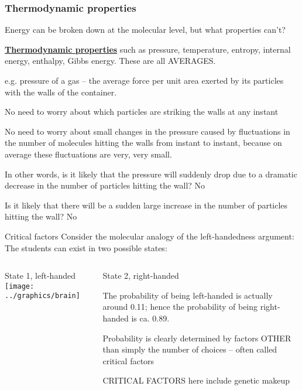 \documentclass[a4paper,12pt,titlepage]{article}
\begin{document}
\begin{frame}[allowframebreaks=0.8]
\frametitle{Thermodynamic properties}
Energy can be broken down at the molecular level, but what properties can't?\newline

\underline{\textbf{Thermodynamic properties}} such as pressure, temperature, entropy, internal energy, enthalpy, Gibbs energy. These are all AVERAGES.

e.g. pressure of a gas -- the average force per unit area exerted by its particles with the walls of the container. \newline

No need to worry about which particles are striking the walls at any instant \newline

No need to worry about small changes in the pressure caused by fluctuations in the number of molecules hitting the walls from instant to instant, because on average these fluctuations are very, very small. \newline

In other words, is it likely that the pressure will suddenly drop due to a dramatic decrease in the number of particles hitting the wall? No \newline

Is it likely that there will be a sudden large increase in the number of particles hitting the wall? No
\end{frame}

\begin{frame}{Critical factors}
Consider the molecular analogy of the left-handedness argument:\\ The students can exist in two possible states: \newline

\begin{columns}[onlytextwidth]
\begin{column}{.4\textwidth}
State 1, left-handed
	\texttt{[image: ../graphics/brain]}
\end{column}
\begin{column}{.6\textwidth}
State 2, right-handed\newline

The probability of being left-handed is actually around 0.11; hence the probability of being right-handed is ca. 0.89.\par
Probability is clearly determined by factors OTHER than simply the number of choices -- often called critical factors\par
CRITICAL FACTORS here include genetic makeup
\end{column}
\end{columns}
\end{frame}
\end{document}
